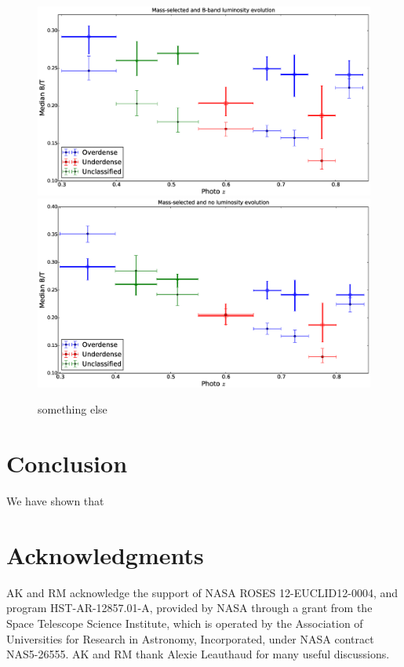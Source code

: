 \documentclass[twocolumn,useAMS,usenatbib]{mn2e}
\begin{document}
\begin{figure}
 \centering
 \includegraphics[width=\columnwidth]{median_dvcbtt}
 \includegraphics[width=\columnwidth]{median_dvcbtt(2)}
 \caption{something else}
 \label{fig:median_dvcbtt}
\end{figure}

\section{Conclusion}
\label{S:conclusion}

We have shown that 
\section*{Acknowledgments}

AK and RM acknowledge the support of NASA ROSES 12-EUCLID12-0004, and
program HST-AR-12857.01-A, provided by NASA through a grant from the
Space Telescope Science Institute, which is operated by the
Association of Universities for Research in Astronomy, Incorporated,
under NASA contract NAS5-26555. AK and RM thank Alexie Leauthaud for many useful discussions.
\end{document}
